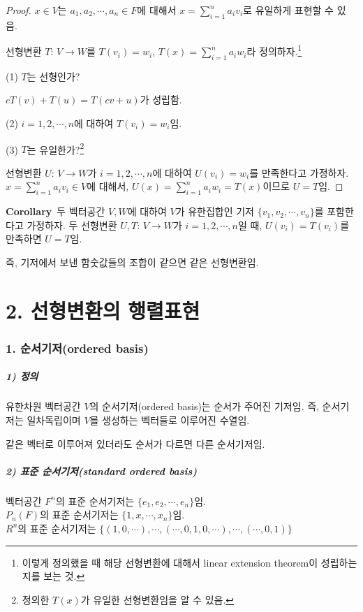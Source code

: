 \begin{proof}
$x \in V$는 $a_1,a_2, \cdots ,a_n \in F$에 대해서 $x=\sum_{i=1}^{n}{a_{i}v_{i}}$로 유일하게 표현할 수 있음.

선형변환 $T:\,V \rightarrow W$를 $T(v_i)=w_i$, $T(x)=\sum_{i=1}^{n}{a_{i}w_{i}}$라 정의하자.\footnote{이렇게 정의했을 때 해당 선형변환에 대해서 linear extension theorem이 성립하는지를 보는 것.}

(1) $T$는 선형인가?

$cT(v)+T(u)=T(cv+u)$가 성립함.

(2) $i=1,2, \cdots ,n$에 대하여 $T(v_i)=w_i$임.

(3) $T$는 유일한가?\footnote{정의한 $T(x)$가 유일한 선형변환임을 알 수 있음.}

선형변환 $U:\,V \rightarrow W$가 $i=1,2, \cdots ,n$에 대하여 $U(v_i)=w_i$를 만족한다고 가정하자. $x=\sum_{i=1}^{n}{a_{i}v_{i}} \in V$에 대해서, $U(x)=\sum_{i=1}^{n}{a_{i}w_{i}}=T(x)$이므로 $U=T$임.
\end{proof}

\textbf{Corollary}\, 두 벡터공간 $V,W$에 대하여 $V$가 유한집합인 기저 $\{v_1,v_2, \cdots ,v_n\}$를 포함한다고 가정하자. 두 선형변환 $U,T:\,V \rightarrow W$가 $i=1,2, \cdots ,n$일 때, $U(v_i)=T(v_i)$를 만족하면 $U=T$임.

즉, 기저에서 보낸 함숫값들의 조합이 같으면 같은 선형변환임.


\newpage


\part*{2. 선형변환의 행렬표현}

\section*{1. 순서기저(ordered basis)}

\subsubsection*{1) 정의\\}
\begin{DEF}
유한차원 벡터공간 $V$의 순서기저(ordered basis)는 순서가 주어진 기저임. 즉, 순서기저는 일차독립이며 $V$를 생성하는 벡터들로 이루어진 수열임.
\end{DEF}

같은 벡터로 이루어져 있더라도 순서가 다르면 다른 순서기저임.

\subsubsection*{2) 표준 순서기저(standard ordered basis)}
벡터공간 $F^n$의 표준 순서기저는 $\{e_1,e_2, \cdots ,e_n\}$임.\\
$P_n(F)$의 표준 순서기저는 $\{1,x, \cdots ,x_n\}$임.\\
$R^n$의 표준 순서기저는 $\{{(1,0, \cdots), \cdots ,(\cdots ,0,1,0, \cdots), \cdots ,(\cdots ,0,1)}\}$


